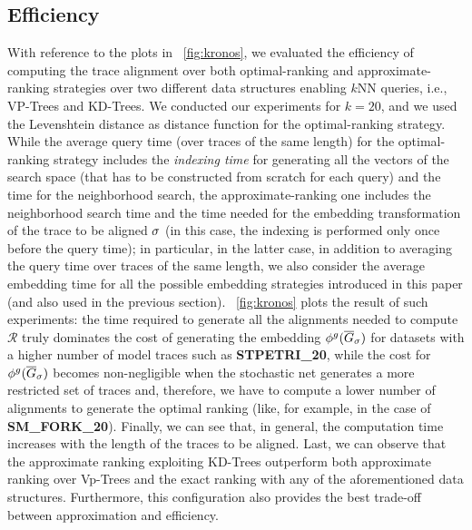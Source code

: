 \subsection{Efficiency}\label{subsec:efficio}
With reference to the plots in \figurename~\ref{fig:kronos}, we evaluated the efficiency of computing the trace alignment over both optimal-ranking   and approximate-ranking   strategies over two different data structures enabling $k$NN queries, i.e., VP-Trees and KD-Trees. We conducted our experiments for $k=20$, and we used the Levenshtein distance as distance function for the optimal-ranking strategy. While the average query time (over traces of the same length) for the optimal-ranking strategy includes the \textit{indexing time} for generating all the vectors of the search space (that has to be constructed from scratch for each query) and the time for the neighborhood search, the approximate-ranking one includes the neighborhood search time and the time needed for the embedding transformation of the trace to be aligned $\sigma$ (in this case, the indexing is performed only once before the query time); in particular, in the latter case, in addition to averaging the query time over traces of the same length, we also consider the average embedding time for all the possible embedding strategies introduced in this paper (and also used in the previous section). \figurename~\ref{fig:kronos} plots the result of such experiments: the time required to generate all the alignments needed to compute $\mathcal{R}$ truly dominates the cost of generating the embedding ${\phi^{g}}(\overline{G}_\sigma)$ for datasets with a higher number of model traces such as \textbf{STPETRI\_20}, while the cost for ${\phi^{g}}(\overline{G}_\sigma)$ becomes non-negligible when the stochastic net generates a more restricted set of traces and, therefore, we have to compute a lower number of alignments to generate the optimal ranking (like, for example, in the case of \textbf{SM\_FORK\_20}). Finally, we can see that, in general, the computation time increases with the length of the traces to be aligned. Last, we can observe that the approximate ranking exploiting KD-Trees outperform both approximate ranking over Vp-Trees and the exact ranking with any of the aforementioned data structures. Furthermore, this configuration also provides the best trade-off between approximation and efficiency.